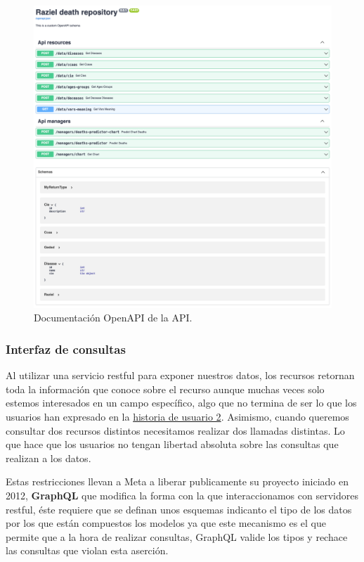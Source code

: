 \begin{figure}[h]
	\centering	
	\includegraphics[width=\textwidth]{doc/logos/imgs/openapi.png}
	\caption{ Documentación OpenAPI de la API. }
    \label{fig:worst_f_value}
\end{figure}

\subsubsection{Interfaz de consultas}
Al utilizar una servicio restful para exponer nuestros datos, los recursos retornan toda
la información que conoce sobre el recurso aunque muchas veces solo estemos interesados en
un campo específico, algo que no termina de ser lo que los usuarios han expresado en la
\hyperref[sec:hu2]{historia de usuario 2}. Asimismo, cuando queremos consultar dos
recursos distintos necesitamos realizar dos llamadas distintas. Lo que hace que los
usuarios no tengan libertad absoluta sobre las consultas que realizan a los datos.

Estas restricciones llevan a Meta a liberar publicamente su proyecto iniciado en 2012,
\textbf{GraphQL} que modifica la forma con la que interaccionamos con servidores restful,
éste requiere que se definan unos esquemas indicanto el tipo de los datos por los que
están compuestos los modelos ya que este mecanismo es el que permite que a la hora de
realizar consultas, GraphQL valide los tipos y rechace las consultas que violan esta
aserción.

